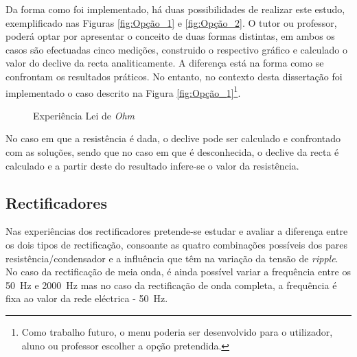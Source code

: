 Da forma como foi implementado, há duas possibilidades de realizar este estudo, exemplificado nas Figuras \ref{fig:Opção_1} e \ref{fig:Opção_2}. O tutor ou professor, poderá optar por apresentar o conceito de duas formas distintas, em ambos os casos são efectuadas cinco medições, construido o respectivo gráfico e calculado o valor do declive da recta analiticamente. A diferença está na forma como se confrontam os resultados práticos. No entanto, no contexto desta dissertação foi  implementado o caso descrito na Figura \ref{fig:Opção_1}\footnote{Como trabalho futuro, o menu poderia ser desenvolvido para o utilizador, aluno ou professor escolher a opção pretendida.}. 

\begin{figure}[hbtp]
	\centering%
		\centering
		\qquad
		\caption{Experiência Lei de \textit{Ohm}}%
		\label{fig:experienciaOHM}%
	\end{figure}

No caso em que a resistência é dada, o declive pode ser calculado e confrontado com as soluções, sendo que no caso em que é desconhecida, o declive da recta é calculado e a partir deste do resultado infere-se o valor da resistência. 

\subsection{Rectificadores}
\label{sec:circuitosrectificadores}
Nas experiências dos rectificadores pretende-se estudar e avaliar a diferença entre os dois tipos de rectificação, consoante as quatro combinações possíveis dos pares resistência/condensador e a influência que têm na variação da tensão de \textit{ripple}. No caso da rectificação de meia onda, é ainda possível variar a frequência entre os \SI{50}{\hertz} e \SI{2000}{\hertz} mas no caso da rectificação de onda completa, a frequência é fixa ao valor da rede eléctrica - \SI{50}{\hertz}.

